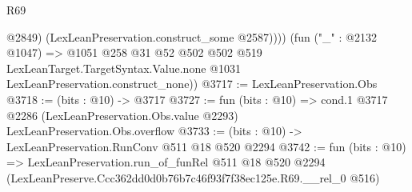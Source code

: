 \begin{lexlean}{R69}
\begin{coremodule}
              @2849)
            (LexLeanPreservation.construct_some @2587))))
      (fun ("_" : @2132 @1047) =>
      @1051
        @258
        @31
        @52
        @502
        @502
        @519
        LexLeanTarget.TargetSyntax.Value.none
        @1031
        LexLeanPreservation.construct_none))
@3717 := LexLeanPreservation.Obs
@3718 := (bits : @10) -> @3717
@3727 := fun (bits : @10) =>
  cond.{1} @3717 @2286 (LexLeanPreservation.Obs.value @2293) LexLeanPreservation.Obs.overflow
@3733 := (bits : @10) -> LexLeanPreservation.RunConv @511 @18 @520 @2294
@3742 := fun (bits : @10) =>
  LexLeanPreservation.run_of_funRel
    @511
    @18
    @520
    @2294
    (LexLeanPreserve.Ccc362dd0d0b76b7c46f93f7f38ec125e.R69.__rel_0 @516)
\end{coremodule}
\end{lexlean}
